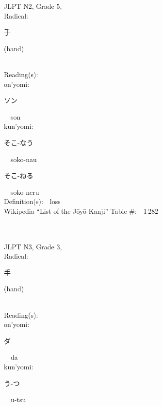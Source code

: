 \begin{multicols}{2}
{JLPT N2, Grade 5, \\Radical:\ \ {\begin{CJK}{UTF8}{min} 手 \end{CJK}} (hand) } \\
Reading(s):\ \ \\
{\hspace*{1em}}on'yomi:\ \ \\
{\hspace*{2em}}{\begin{CJK}{UTF8}{min} ソン \end{CJK}}\ \ son\ \ \\
{\hspace*{1em}}kun'yomi:\ \ \\
{\hspace*{2em}}{\begin{CJK}{UTF8}{min} そこ-なう \end{CJK}}\ \ soko-nau\ \ \\
{\hspace*{2em}}{\begin{CJK}{UTF8}{min} そこ-ねる \end{CJK}}\ \ soko-neru\ \ \\
Definition(s):\ \ loss \\
Wikipedia ``List of the J\=oy\=o Kanji'' Table \#:\ \ 1\,282 \\
\ \ \\
{\fontsize{34pt}{40pt}  }\ \ \\  %
{JLPT N3, Grade 3, \\Radical:\ \ {\begin{CJK}{UTF8}{min} 手 \end{CJK}} (hand) } \\
Reading(s):\ \ \\
{\hspace*{1em}}on'yomi:\ \ \\
{\hspace*{2em}}{\begin{CJK}{UTF8}{min} ダ \end{CJK}}\ \ da\ \ \\
{\hspace*{1em}}kun'yomi:\ \ \\
{\hspace*{2em}}{\begin{CJK}{UTF8}{min} う-つ \end{CJK}}\ \ u-tsu\ \ \\

\end{multicols}
